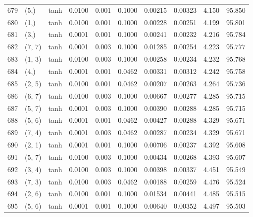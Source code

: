\begin{tabular}{lllrrrrrrr}
679 &        (5,) &      tanh &  0.0100 &  0.001 &  0.1000 &          0.00215 &    0.00323 &       4.150 &    95.850 \\
680 &        (1,) &      tanh &  0.0100 &  0.001 &  0.1000 &          0.00228 &    0.00251 &       4.199 &    95.801 \\
681 &        (3,) &      tanh &  0.0001 &  0.001 &  0.1000 &          0.00241 &    0.00232 &       4.216 &    95.784 \\
682 &      (7, 7) &      tanh &  0.0001 &  0.003 &  0.1000 &          0.01285 &    0.00254 &       4.223 &    95.777 \\
683 &      (1, 3) &      tanh &  0.0100 &  0.003 &  0.1000 &          0.00258 &    0.00234 &       4.232 &    95.768 \\
684 &        (4,) &      tanh &  0.0001 &  0.001 &  0.0462 &          0.00331 &    0.00312 &       4.242 &    95.758 \\
685 &      (2, 5) &      tanh &  0.0100 &  0.001 &  0.0462 &          0.00207 &    0.00263 &       4.264 &    95.736 \\
686 &      (6, 7) &      tanh &  0.0100 &  0.003 &  0.1000 &          0.00667 &    0.00277 &       4.285 &    95.715 \\
687 &      (5, 7) &      tanh &  0.0001 &  0.003 &  0.1000 &          0.00390 &    0.00288 &       4.285 &    95.715 \\
688 &      (5, 6) &      tanh &  0.0001 &  0.001 &  0.0462 &          0.00427 &    0.00288 &       4.329 &    95.671 \\
689 &      (7, 4) &      tanh &  0.0001 &  0.003 &  0.0462 &          0.00287 &    0.00234 &       4.329 &    95.671 \\
690 &      (2, 1) &      tanh &  0.0001 &  0.001 &  0.1000 &          0.00706 &    0.00237 &       4.392 &    95.608 \\
691 &      (5, 7) &      tanh &  0.0100 &  0.003 &  0.1000 &          0.00434 &    0.00268 &       4.393 &    95.607 \\
692 &      (3, 4) &      tanh &  0.0100 &  0.003 &  0.1000 &          0.00398 &    0.00337 &       4.451 &    95.549 \\
693 &      (7, 3) &      tanh &  0.0100 &  0.003 &  0.0462 &          0.00188 &    0.00259 &       4.476 &    95.524 \\
694 &      (2, 6) &      tanh &  0.0100 &  0.001 &  0.1000 &          0.01534 &    0.00441 &       4.485 &    95.515 \\
695 &      (5, 6) &      tanh &  0.0001 &  0.001 &  0.1000 &          0.00640 &    0.00352 &       4.497 &    95.503 \\

\end{tabular}
